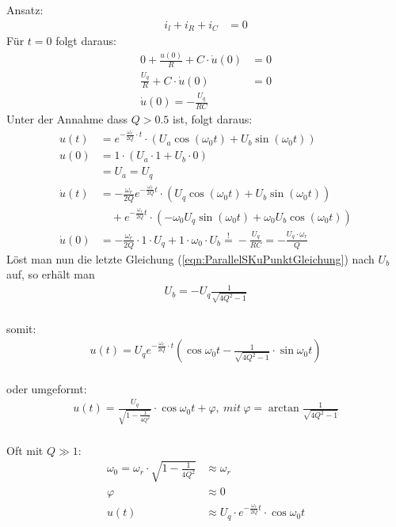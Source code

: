 Ansatz:
\begin{align*}
i_l + i_R + i_C &= 0
\end{align*}
Für $t=0$ folgt daraus:
\begin{align}
0 + \frac{u(0)}{R} + C \cdot \dot{u}(0) &= 0 \nonumber \\
\frac{U_q}{R} + C \cdot \dot{u}(0) &= 0 \nonumber \\
\boxed{\dot{u}(0) = -\frac{U_q}{RC}}
\end{align}
Unter der Annahme dass $Q > 0.5$ ist, folgt daraus:
\begin{align}
u(t) &= e^{-\frac{\omega_r}{2Q}\cdot t} \cdot \left(U_a \cos(\omega_0 t) + U_b
\sin(\omega_0 t) \right) \nonumber \\
u(0) &= 1 \cdot \left(U_a \cdot 1 + U_b \cdot 0 \right) \nonumber \\
&\boxed{= U_a = U_q} \\
\dot{u}(t) &= -\frac{\omega_r}{2Q} e^{-\frac{\omega_r}{2Q}t} \cdot \left(
U_q \cos(\omega_0 t) + U_b \sin(\omega_0 t)\right) \nonumber \\
&\quad + e^{-\frac{\omega_r}{2Q}t} \cdot \left( -\omega_0 U_q
\sin(\omega_0 t) + \omega_0 U_b \cos(\omega_0 t)\right) \nonumber \\
\dot{u}(0) &= -\frac{\omega_r}{2Q} \cdot 1 \cdot U_q + 1 \cdot \omega_0 \cdot
U_b \overset{!}{=} -\frac{U_q}{RC} =
-\frac{U_q \cdot \omega_r}{Q}\label{eqn:ParallelSKuPunktGleichung}
\end{align}
Löst man nun die letzte Gleichung (\ref{eqn:ParallelSKuPunktGleichung}) nach
$U_b$ auf, so erhält man
\begin{align}
\boxed{U_b = -U_q \frac{1}{\sqrt{4Q^2-1}}}
\end{align}\\
somit:
\begin{align}
\boxed{
u(t)=U_q e^{-\frac{\omega_r}{2Q}\cdot
t}(\cos{\omega_0t}-\frac{1}{\sqrt{4Q^2-1}}\cdot \sin{\omega_0t})}
\end{align} \\
oder umgeformt:
\begin{align}
u(t)=\frac{U_q}{\sqrt{1-\frac{1}{4Q^2}}}\cdot
\cos{\omega_0t+\varphi},\ mit\ \varphi=\arctan{\frac{1}{\sqrt{4Q^2-1}}}\nonumber
\end{align}\\
Oft mit $Q\gg 1$:
\begin{align}
	\omega_0 = \omega_r \cdot \sqrt{1-\frac{1}{4Q^2}} &\approx\omega_r \nonumber \\
	\varphi &\approx 0 \nonumber \\
	u(t) &\approx U_q \cdot e^{-\frac{\omega_r}{2Q}t}\cdot\cos{\omega_0t}\nonumber
\end{align}\\
